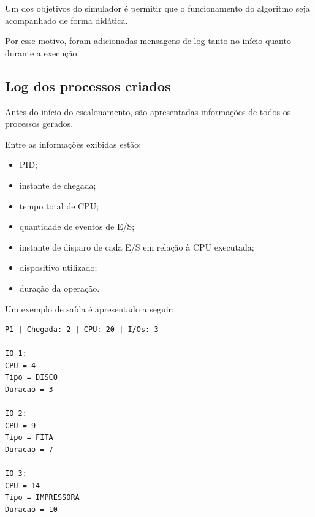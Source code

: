 \documentclass[12pt,a4paper]{article}
\begin{document}
Um dos objetivos do simulador é permitir que o funcionamento do
algoritmo seja acompanhado de forma didática.

Por esse motivo, foram adicionadas mensagens de log tanto no início
quanto durante a execução.



\subsection{Log dos processos criados}

Antes do início do escalonamento, são apresentadas informações de
todos os processos gerados.

Entre as informações exibidas estão:

\begin{itemize}

    \item PID;

    \item instante de chegada;

    \item tempo total de CPU;

    \item quantidade de eventos de E/S;

    \item instante de disparo de cada E/S em relação à CPU executada;

    \item dispositivo utilizado;

    \item duração da operação.

\end{itemize}

Um exemplo de saída é apresentado a seguir:

\begin{lstlisting}
P1 | Chegada: 2 | CPU: 20 | I/Os: 3

IO 1:
CPU = 4
Tipo = DISCO
Duracao = 3

IO 2:
CPU = 9
Tipo = FITA
Duracao = 7

IO 3:
CPU = 14
Tipo = IMPRESSORA
Duracao = 10
\end{lstlisting}


\end{document}
